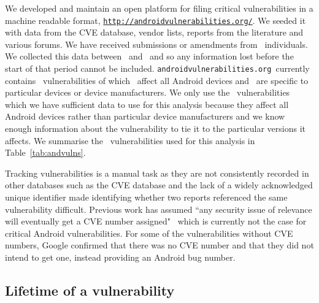 \documentclass[conference,a4paper,twoside]{IEEEtran}
\let\OldTodo\todo
\renewcommand{\todo}{\OldTodo[inline]}
\newcommand{\todolater}[1]{}%
\newcommand{\avo}{\texttt{androidvulnerabilities.org}}
\begin{document}
We developed and maintain an open platform for filing critical vulnerabilities in a machine readable format, \texttt{\url{http://androidvulnerabilities.org/}}.
We seeded it with data from the CVE database, vendor lists, reports from the literature and various forums.
We have received submissions or amendments from \avoNumSubmitters\ individuals.
We collected this data between \avoStartDate\ and \avoEndDate\ and so any information lost before the start of that period cannot be included.
\avo\ currently contains \avoNumVulnerabilities\ vulnerabilities of which \avoNumVulnAllAndroid\ affect all Android devices and \avoNumVulnSpecific\ are specific to particular devices or device manufacturers.
We only use the \daNumVulnsUsed\ vulnerabilities which we have sufficient data to use for this analysis because they affect all Android devices rather than particular device manufacturers and we know enough information about the vulnerability to tie it to the particular versions it affects.
We summarise the \daNumVulnsUsed\ vulnerabilities used for this analysis in Table~\ref{tab:andvulns}.\todolater{We have published full details of the \daNumVulnsUsed\ vulnerabilities used for this analysis in an accompanying technical report~\cite{TODO}}


Tracking vulnerabilities is a manual task as they are not consistently recorded in other databases such as the CVE database and the lack of a widely acknowledged unique identifier made identifying whether two reports referenced the same vulnerability difficult.
Previous work has assumed ``any security issue of relevance will eventually get a CVE number assigned"~\cite{Frei2010} which is currently not the case for critical Android vulnerabilities.
For some of the vulnerabilities without CVE numbers, Google confirmed that there was no CVE number and that they did not intend to get one, instead providing an Android bug number.


\subsection{Lifetime of a vulnerability}
\end{document}
